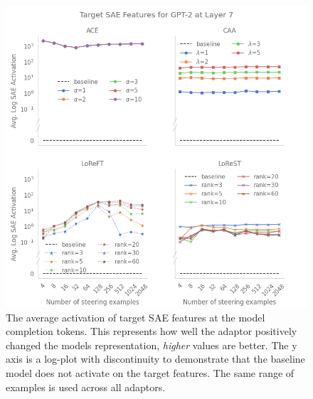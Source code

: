 \begin{figure}
    \centering
    \captionsetup{width=\textwidth}
    \includegraphics[width=\textwidth]{figures/gpt2_7_target.png}
    \caption{
        The average activation of target SAE features at the model completion tokens.
        This represents how well the adaptor positively changed the models representation, \emph{higher} values are better.
        The y axis is a log-plot with discontinuity to demonstrate that the baseline model does not activate on the target features.
        The same range of examples is used across all adaptors.
    }
    \label{fig:gpt-pp-target}
\end{figure}

